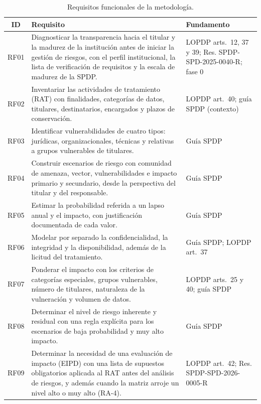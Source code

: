 \begin{table}[htbp]
  \centering
  \caption{Requisitos funcionales de la metodología.}
  \label{tab:rf}
  \footnotesize
  \renewcommand{\arraystretch}{1.2}
  \begin{tabularx}{\textwidth}{|c|L|p{3.6cm}|}
    \hline
    \textbf{ID} & \textbf{Requisito} & \textbf{Fundamento} \\
    \hline
    RF01 & Diagnosticar la transparencia hacia el titular y la madurez de la institución antes de iniciar la gestión de riesgos, con el perfil institucional, la lista de verificación de requisitos y la escala de madurez de la SPDP. & LOPDP arts.~12, 37 y 39; Res. SPDP-SPD-2025-0040-R; fase 0 \\
    \hline
    RF02 & Inventariar las actividades de tratamiento (RAT) con finalidades, categorías de datos, titulares, destinatarios, encargados y plazos de conservación. & LOPDP art.~40; guía SPDP (contexto) \\
    \hline
    RF03 & Identificar vulnerabilidades de cuatro tipos: jurídicas, organizacionales, técnicas y relativas a grupos vulnerables de titulares. & Guía SPDP \\
    \hline
    RF04 & Construir escenarios de riesgo con comunidad de amenaza, vector, vulnerabilidades e impacto primario y secundario, desde la perspectiva del titular y del responsable. & Guía SPDP \\
    \hline
    RF05 & Estimar la probabilidad referida a un lapso anual y el impacto, con justificación documentada de cada valor. & Guía SPDP \\
    \hline
    RF06 & Modelar por separado la confidencialidad, la integridad y la disponibilidad, además de la licitud del tratamiento. & Guía SPDP; LOPDP art.~37 \\
    \hline
    RF07 & Ponderar el impacto con los criterios de categorías especiales, grupos vulnerables, número de titulares, naturaleza de la vulneración y volumen de datos. & LOPDP arts.~25 y 40; guía SPDP \\
    \hline
    RF08 & Determinar el nivel de riesgo inherente y residual con una regla explícita para los escenarios de baja probabilidad y muy alto impacto. & Guía SPDP \\
    \hline
    RF09 & Determinar la necesidad de una evaluación de impacto (EIPD) con una lista de supuestos obligatorios aplicada al RAT antes del análisis de riesgos, y además cuando la matriz arroje un nivel alto o muy alto (RA-4). & LOPDP art.~42; Res. SPDP-SPD-2026-0005-R \\

\end{tabularx}
\end{table}
